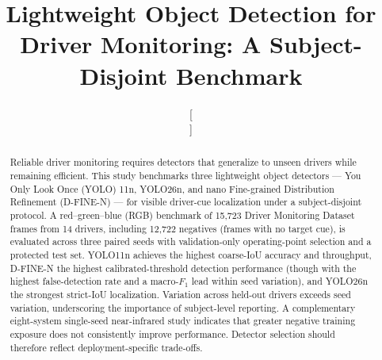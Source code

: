 \documentclass[conference]{IEEEtran}
\newcommand{\rev}[1]{{\color{blue}#1}}
\begin{document}

\title{Lightweight Object Detection for Driver Monitoring: A Subject-Disjoint Benchmark}

\author{
\and
{}
\and[\hfill\mbox{}\par\mbox{}\hfill]
\and
{}
}

\maketitle
\raggedbottom

\begin{abstract}
Reliable driver monitoring requires detectors that generalize to unseen drivers while remaining efficient. This study benchmarks three lightweight object detectors --- You Only Look Once (YOLO) 11n, YOLO26n, and nano Fine-grained Distribution Refinement (D-FINE-N) --- for visible driver-cue localization under a subject-disjoint protocol. A red--green--blue (RGB) benchmark of 15,723 Driver Monitoring Dataset frames from 14 drivers, including 12,722 negatives \rev{(frames with no target cue)}, is evaluated across three paired seeds with validation-only operating-point selection and a protected test set. YOLO11n achieves the highest coarse-IoU accuracy and throughput, D-FINE-N the highest calibrated-threshold detection performance \rev{(though with the highest false-detection rate and a macro-$F_1$ lead within seed variation)}, and YOLO26n the strongest strict-IoU localization. Variation across held-out drivers exceeds seed variation, underscoring the importance of subject-level reporting. A complementary eight-system \rev{single-seed} near-infrared study \rev{indicates} that greater negative training exposure does not consistently improve performance. Detector selection should therefore reflect deployment-specific trade-offs.
\end{abstract}
\end{document}

